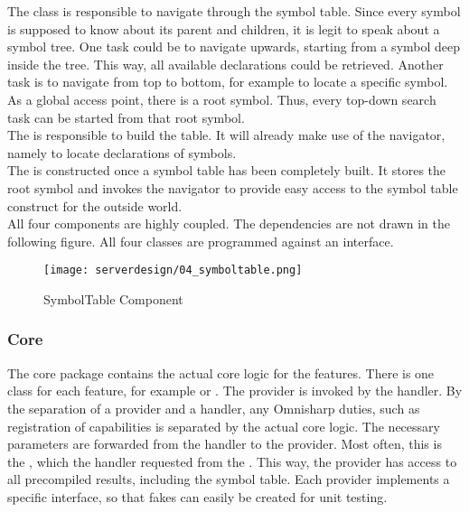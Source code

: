 The class  is responsible to navigate through the symbol table.
Since every symbol is supposed to know about its parent and children, it is legit to speak about a symbol tree.
One task could be to navigate upwards, starting from a symbol deep inside the tree.
This way, all available declarations could be retrieved.
Another task is to navigate from top to bottom, for example to locate a specific symbol.
As a global access point, there is a root symbol.
Thus, every top-down search task can be started from that root symbol.\\

The  is responsible to build the table.
It will already make use of the navigator, namely to locate declarations of symbols.\\

The  is constructed once a symbol table has been completely built.
It stores the root symbol and invokes the navigator to provide easy access to the symbol table construct for the outside world.\\

All four components are highly coupled.
The dependencies are not drawn in the following figure.
All four classes are programmed against an interface.


\begin{figure}[H]
    \centering
    \texttt{[image: serverdesign/04\_symboltable.png]}
    \caption{SymbolTable Component}
    \label{fig:server_st}
\end{figure}

\subsubsection {Core}
The core package contains the actual core logic for the features.
There is one class for each feature, for example  or .
The provider is invoked by the handler.
By the separation of a provider and a handler, any Omnisharp duties, such as registration of capabilities is separated by the actual core logic.
The necessary parameters are forwarded from the handler to the provider.
Most often, this is the , which the handler requested from the .
This way, the provider has access to all precompiled results, including the symbol table.
Each provider implements a specific interface, so that fakes can easily be created for unit testing.

